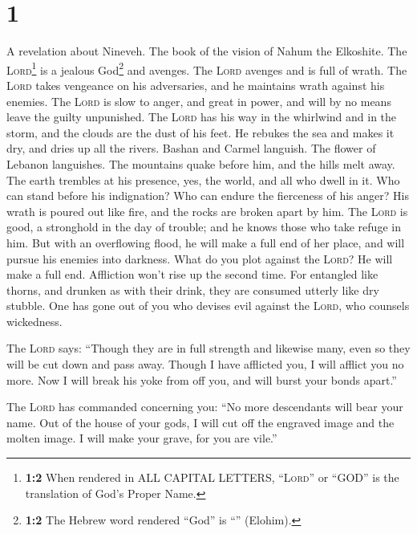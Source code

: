 \hypertarget{section}{%
\section{1}\label{section}}

 A revelation about Nineveh. The book of the vision of
Nahum the Elkoshite.  The \textsc{Lord}\footnote{\textbf{1:2}
  When rendered in ALL CAPITAL LETTERS, ``\textsc{Lord}'' or ``GOD'' is
  the translation of God's Proper Name.} is a jealous God\footnote{\textbf{1:2}
  The Hebrew word rendered ``God'' is ``'' (Elohim).} and
avenges. The \textsc{Lord} avenges and is full of wrath. The
\textsc{Lord} takes vengeance on his adversaries, and he maintains wrath
against his enemies.  The \textsc{Lord} is slow to anger,
and great in power, and will by no means leave the guilty unpunished.
The \textsc{Lord} has his way in the whirlwind and in the storm, and the
clouds are the dust of his feet.  He rebukes the sea and
makes it dry, and dries up all the rivers. Bashan and Carmel languish.
The flower of Lebanon languishes.  The mountains quake
before him, and the hills melt away. The earth trembles at his presence,
yes, the world, and all who dwell in it.  Who can stand
before his indignation? Who can endure the fierceness of his anger? His
wrath is poured out like fire, and the rocks are broken apart by him.
 The \textsc{Lord} is good, a stronghold in the day of
trouble; and he knows those who take refuge in him.  But
with an overflowing flood, he will make a full end of her place, and
will pursue his enemies into darkness.  What do you plot
against the \textsc{Lord}? He will make a full end. Affliction won't
rise up the second time.  For entangled like thorns, and
drunken as with their drink, they are consumed utterly like dry stubble.
 One has gone out of you who devises evil against the
\textsc{Lord}, who counsels wickedness.

 The \textsc{Lord} says: ``Though they are in full
strength and likewise many, even so they will be cut down and pass away.
Though I have afflicted you, I will afflict you no more. 
Now I will break his yoke from off you, and will burst your bonds
apart.''

 The \textsc{Lord} has commanded concerning you: ``No
more descendants will bear your name. Out of the house of your gods, I
will cut off the engraved image and the molten image. I will make your
grave, for you are vile.''

